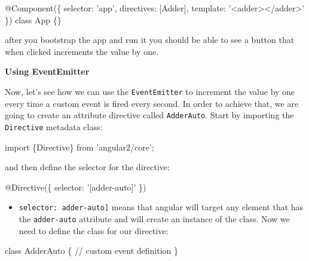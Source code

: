 \documentclass[12pt,]{article}
\newenvironment{Shaded}{}{}
\newcommand{\KeywordTok}[1]{\textcolor[rgb]{0.00,0.00,1.00}{{#1}}}
\newcommand{\CommentTok}[1]{\textcolor[rgb]{0.00,0.50,0.00}{{#1}}}
\newcommand{\FunctionTok}[1]{{#1}}
\newcommand{\NormalTok}[1]{{#1}}
\providecommand{\tightlist}{%
  \setlength{\itemsep}{0pt}\setlength{\parskip}{0pt}}
\begin{document}
\begin{Shaded}
\begin{Highlighting}[numbers=left,,]
\FunctionTok{@Component}\NormalTok{(\{}
  \NormalTok{selector: 'app',}
  \NormalTok{directives: [Adder],}
  \NormalTok{template: '<adder></adder>'}
\NormalTok{\})}
\KeywordTok{class} \NormalTok{App \{\}}
\end{Highlighting}
\end{Shaded}

after you bootstrap the app and run it you should be able to see a
button that when clicked increments the value by one.

\textbf{Using EventEmitter}

Now, let's see how we can use the \texttt{EventEmitter} to increment the
value by one every time a custom event is fired every second. In order
to achieve that, we are going to create an attribute directive called
\texttt{AdderAuto}. Start by importing the \texttt{Directive} metadata
class:

\begin{Shaded}
\begin{Highlighting}[numbers=left,,]
\KeywordTok{import \{Directive\} from 'angular2/core';}
\end{Highlighting}
\end{Shaded}

and then define the selector for the directive:

\begin{Shaded}
\begin{Highlighting}[numbers=left,,]
\FunctionTok{@Directive}\NormalTok{(\{}
  \NormalTok{selector: '[adder-auto]'}
\NormalTok{\})}
\end{Highlighting}
\end{Shaded}

\begin{itemize}
\tightlist
\item
  \texttt{selector:\ \textquotesingle{}{[}adder-auto{]}\textquotesingle{}}
  means that angular will target any element that has the
  \texttt{adder-auto} attribute and will create an instance of the
  class. Now we need to define the class for our directive:
\end{itemize}

\begin{Shaded}
\begin{Highlighting}[numbers=left,,]
\KeywordTok{class} \NormalTok{AdderAuto \{}
  \CommentTok{// custom event definition}
\NormalTok{\}}
\end{Highlighting}
\end{Shaded}
\end{document}
